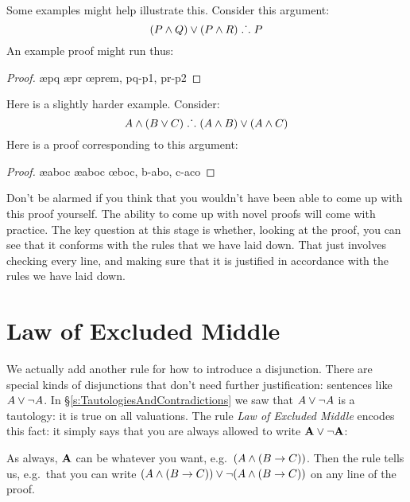 Some examples might help illustrate this. Consider this argument:
$$(P \wedge Q) \vee (P \wedge R) \mathrel{\ldotp\dot{}\,\ldotp} P$$
An example proof might run thus:
	\begin{proof}
			\open
				\ae{pq}
			\close
			\open
				\ae{pr}
			\close
		\oe{prem, pq-p1, pr-p2}
	\end{proof}
Here is a slightly harder example. Consider:
	$$ A \wedge (B \vee C) \mathrel{\ldotp\dot{}\,\ldotp} (A \wedge B) \vee (A \wedge C)$$
Here is a proof corresponding to this argument:
	\begin{proof}
		\ae{aboc}
		\ae{aboc}
		\open
		\close
		\open
		\close
	\oe{boc, b-abo, c-aco}
	\end{proof}
Don't be alarmed if you think that you wouldn't have been able to come up with this proof yourself. The ability to come up with novel proofs will come with practice. The key question at this stage is whether, looking at the proof, you can see that it conforms with the rules that we have laid down. That just involves checking every line, and making sure that it is justified in accordance with the rules we have laid down.

\section{Law of Excluded Middle}
We actually add another rule for how to introduce a disjunction. There are special kinds of disjunctions that don't need further justification: sentences like $A\vee\neg A$.
In \S\ref{s:TautologiesAndContradictions} we saw that $A\vee\neg A$ is a tautology: it is true on all valuations. 
The rule \emph{Law of Excluded Middle} encodes this fact: it simply says that you are always allowed to write $\mathbf{A}\vee\neg\mathbf{A}$:


As always, $\mathbf{A}$ can be whatever you want, e.g.~$(A\wedge(B\rightarrow C))$. Then the rule tells us, e.g.~that you can write $(A\wedge(B\rightarrow C))\vee\neg(A\wedge(B\rightarrow C))$ on any line of the proof. 

